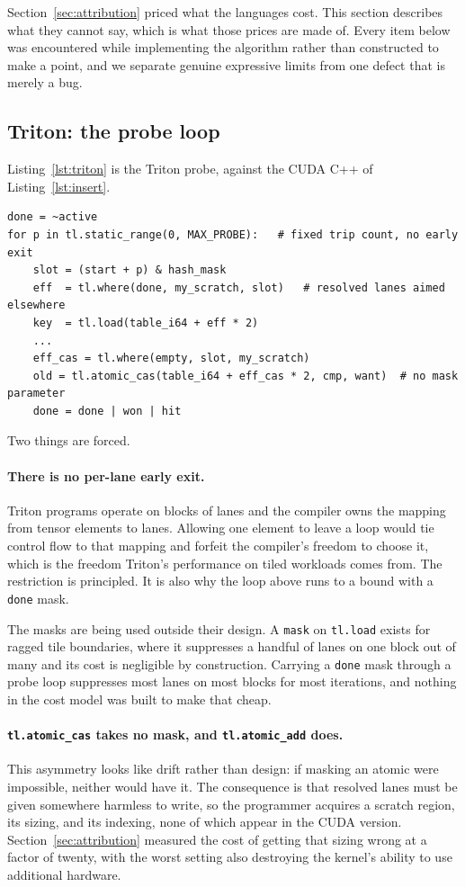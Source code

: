 \documentclass[11pt]{article}
\begin{document}
Section~\ref{sec:attribution} priced what the languages cost. This section
describes what they cannot say, which is what those prices are made of. Every
item below was encountered while implementing the algorithm rather than
constructed to make a point, and we separate genuine expressive limits from one
defect that is merely a bug.

\subsection{Triton: the probe loop}

Listing~\ref{lst:triton} is the Triton probe, against the CUDA C++ of
Listing~\ref{lst:insert}.

\begin{lstlisting}[caption={The same probe in Triton. Both differences from
Listing~\ref{lst:insert} are forced.}, label={lst:triton}]
done = ~active
for p in tl.static_range(0, MAX_PROBE):   # fixed trip count, no early exit
    slot = (start + p) & hash_mask
    eff  = tl.where(done, my_scratch, slot)   # resolved lanes aimed elsewhere
    key  = tl.load(table_i64 + eff * 2)
    ...
    eff_cas = tl.where(empty, slot, my_scratch)
    old = tl.atomic_cas(table_i64 + eff_cas * 2, cmp, want)  # no mask parameter
    done = done | won | hit
\end{lstlisting}

Two things are forced.

\paragraph{There is no per-lane early exit.} Triton programs operate on blocks of
lanes and the compiler owns the mapping from tensor elements to lanes. Allowing
one element to leave a loop would tie control flow to that mapping and forfeit
the compiler's freedom to choose it, which is the freedom Triton's performance on
tiled workloads comes from. The restriction is principled. It is also why the
loop above runs to a bound with a \texttt{done} mask.

The masks are being used outside their design. A \texttt{mask} on
\texttt{tl.load} exists for ragged tile boundaries, where it suppresses a handful
of lanes on one block out of many and its cost is negligible by construction.
Carrying a \texttt{done} mask through a probe loop suppresses most lanes on most
blocks for most iterations, and nothing in the cost model was built to make that
cheap.

\paragraph{\texttt{tl.atomic\_cas} takes no mask, and \texttt{tl.atomic\_add}
does.} This asymmetry looks like drift rather than design: if masking an atomic
were impossible, neither would have it. The consequence is that resolved lanes
must be given somewhere harmless to write, so the programmer acquires a scratch
region, its sizing, and its indexing, none of which appear in the CUDA version.
Section~\ref{sec:attribution} measured the cost of getting that sizing wrong at a
factor of twenty, with the worst setting also destroying the kernel's ability to
use additional hardware.
\end{document}
